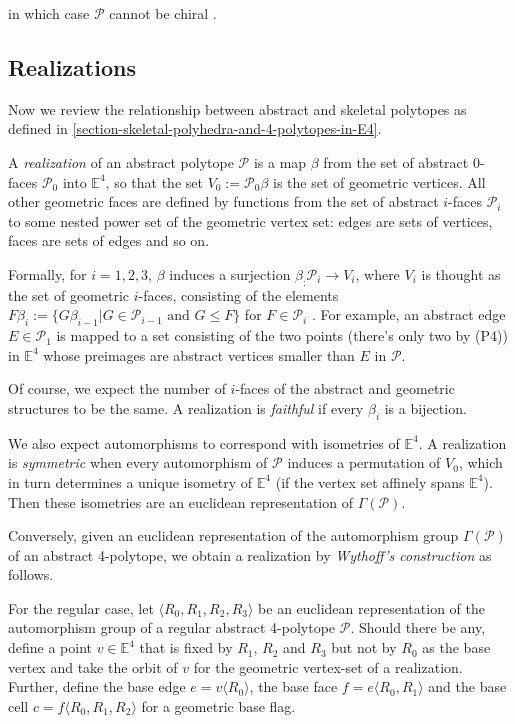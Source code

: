 \documentclass{amsart}
\begin{document}
in which case $\mathcal{P}$ cannot be chiral
\cite[Theorem 1]{egon-asia-chiral}.

\subsection{Realizations}
\label{subsection-realizations}

Now we review the relationship between abstract and skeletal polytopes as
defined in \ref{section-skeletal-polyhedra-and-4-polytopes-in-E4}.
	
A \textit{realization} of an abstract polytope $\mathcal{P}$ is a map $\beta$
from the set of abstract 0-faces $\mathcal{P}_0$ into $\mathbb{E}^4$, so that
the set $V_0:=\mathcal{P}_0\beta$ is the set of geometric vertices. All other
geometric faces are defined by functions from the set of abstract $i$-faces
$\mathcal{P}_i$ to some nested power set of the geometric vertex set: edges are
sets of vertices, faces are sets of edges and so on.
	
Formally, for $i=1,2,3$, $\beta$ induces a surjection $\beta_:\mathcal{P}_i\to
V_i$, where $V_i$ is thought as the set of geometric $i$-faces, consisting of
the elements ${F\beta_i:=\{G\beta_{i-1}|G\in\mathcal{P}_{i-1}\text{ and }G\leq
F\}}$ for $F\in\mathcal{P}_i$ \cite[Theorem 5A1]{ARP}. For example, an
abstract edge $E\in\mathcal{P}_1$ is mapped to a set consisting of the two
points (there's only two by (P4)) in $\mathbb{E}^4$ whose preimages are abstract
vertices smaller than $E$ in $\mathcal{P}$.

Of course, we expect the number of $i$-faces of the abstract and geometric
structures to be the same. A realization is \textit{faithful} if every $\beta_i$
is a bijection.
	
We also expect automorphisms to correspond with isometries of $\mathbb{E}^4$. A
realization is \textit{symmetric} when every automorphism of $\mathcal{P}$
induces a permutation of $V_0$, which in turn determines a unique isometry of
$\mathbb{E}^4$ (if the vertex set affinely spans $\mathbb{E}^4$). Then these
isometries are an euclidean representation of $\Gamma(\mathcal{P})$.
	
Conversely, given an euclidean representation of the automorphism group
$\Gamma(\mathcal{P})$ of an abstract 4-polytope, we obtain a realization by
\textit{Wythoff's construction} as follows.
	
For the regular case, let $\langle R_0, R_1,R_2,R_3\rangle$ be an euclidean
representation of the automorphism group of a regular abstract 4-polytope
$\mathcal{P}$. Should there be any, define a point $v\in\mathbb{E}^4$ that is
fixed by $R_1$, $R_2$ and $R_3$ but not by $R_0$ as the base vertex and take the
orbit of $v$ for the geometric vertex-set of a realization. Further, define the
base edge $e=v\langle R_0\rangle$, the base face $f=e\langle R_0,R_1\rangle$ and
the base cell $c=f\langle R_0,R_1,R_2\rangle$ for a geometric base flag.
\end{document}
